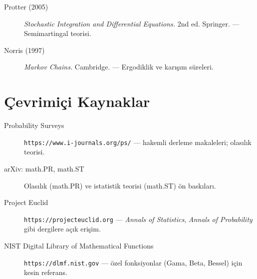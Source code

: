 \begin{description}
  \item[Protter (2005)] \textit{Stochastic Integration and Differential Equations.} 2nd ed. Springer. — Semimartingal teorisi.
  \item[Norris (1997)] \textit{Markov Chains.} Cambridge. — Ergodiklik ve karışım süreleri.
\end{description}

\section{Çevrimiçi Kaynaklar}

\begin{description}
  \item[Probability Surveys] \texttt{https://www.i-journals.org/ps/} — hakemli derleme makaleleri; olasılık teorisi.
  \item[arXiv: math.PR, math.ST] Olasılık (math.PR) ve istatistik teorisi (math.ST) ön baskıları.
  \item[Project Euclid] \texttt{https://projecteuclid.org} — \textit{Annals of Statistics}, \textit{Annals of Probability} gibi dergilere açık erişim.
  \item[NIST Digital Library of Mathematical Functions] \texttt{https://dlmf.nist.gov} — özel fonksiyonlar (Gama, Beta, Bessel) için kesin referans.
\end{description}
